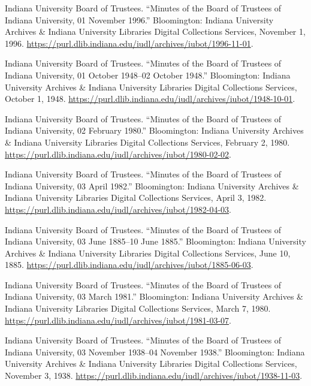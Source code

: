 \documentclass[
  american,
  letterpaper,
]{scrreprt}
\newlength{\cslhangindent}
\newenvironment{CSLReferences}[2] %
 {\begin{list}{}{%
  \setlength{\itemindent}{0pt}
  \setlength{\leftmargin}{0pt}
  \setlength{\parsep}{0pt}
  \ifodd #1
   \setlength{\leftmargin}{\cslhangindent}
   \setlength{\itemindent}{-1\cslhangindent}
  \fi
  \setlength{\itemsep}{#2\baselineskip}}}
 {\end{list}}
\begin{document}
\begin{CSLReferences}{1}{0}
Indiana University Board of Trustees. {``Minutes of the Board of
Trustees of Indiana University, 01 November 1996.''} Bloomington:
Indiana University Archives \& Indiana University Libraries Digital
Collections Services, November 1, 1996.
\url{https://purl.dlib.indiana.edu/iudl/archives/iubot/1996-11-01}.

Indiana University Board of Trustees. {``Minutes of the Board of
Trustees of Indiana University, 01 October 1948--02 October 1948.''}
Bloomington: Indiana University Archives \& Indiana University Libraries
Digital Collections Services, October 1, 1948.
\url{https://purl.dlib.indiana.edu/iudl/archives/iubot/1948-10-01}.

Indiana University Board of Trustees. {``Minutes of the Board of
Trustees of Indiana University, 02 February 1980.''} Bloomington:
Indiana University Archives \& Indiana University Libraries Digital
Collections Services, February 2, 1980.
\url{https://purl.dlib.indiana.edu/iudl/archives/iubot/1980-02-02}.

Indiana University Board of Trustees. {``Minutes of the Board of
Trustees of Indiana University, 03 April 1982.''} Bloomington: Indiana
University Archives \& Indiana University Libraries Digital Collections
Services, April 3, 1982.
\url{https://purl.dlib.indiana.edu/iudl/archives/iubot/1982-04-03}.

Indiana University Board of Trustees. {``Minutes of the Board of
Trustees of Indiana University, 03 June 1885--10 June 1885.''}
Bloomington: Indiana University Archives \& Indiana University Libraries
Digital Collections Services, June 10, 1885.
\url{https://purl.dlib.indiana.edu/iudl/archives/iubot/1885-06-03}.

Indiana University Board of Trustees. {``Minutes of the Board of
Trustees of Indiana University, 03 March 1981.''} Bloomington: Indiana
University Archives \& Indiana University Libraries Digital Collections
Services, March 7, 1980.
\url{https://purl.dlib.indiana.edu/iudl/archives/iubot/1981-03-07}.

Indiana University Board of Trustees. {``Minutes of the Board of
Trustees of Indiana University, 03 November 1938--04 November 1938.''}
Bloomington: Indiana University Archives \& Indiana University Libraries
Digital Collections Services, November 3, 1938.
\url{https://purl.dlib.indiana.edu/iudl/archives/iubot/1938-11-03}.


\end{CSLReferences}
\end{document}
